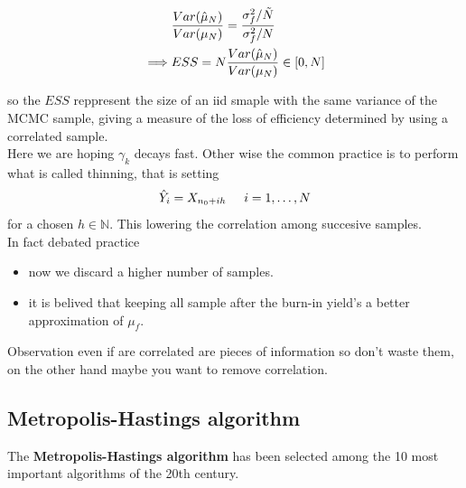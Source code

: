 \documentclass{article}
\begin{document}
\begin{align*}
       &\frac{Var(\hat{\mu}_N)}{Var(\mu_N)} = \frac{\sigma_f^2/\Tilde{N}}{\sigma_f^2/N} \\
    \implies &ESS= N \frac{Var(\hat{\mu}_N)}{Var(\mu_N)}  \in [0,N] 
\end{align*}

so the $ESS$ reppresent the size of an iid smaple with the same variance of the MCMC sample, giving a measure of the loss of efficiency determined by using a correlated sample. \\
Here we are hoping $\gamma_k$ decays fast. Other wise the common practice is to perform what is called thinning, that is setting 
\begin{equation*}
    \hat{Y}_i = X_{n_0+ih } \hspace{0.5 cm} i = 1, \dots, N
\end{equation*}
for a chosen $h \in \mathbb{N}$. This lowering the correlation among succesive samples. \\
In fact debated practice 
\begin{itemize}
    \item now we discard a higher number of samples.
    \item it is belived that keeping all sample after the burn-in yield's a better approximation of $\mu_f$.
\end{itemize}
Observation even if are correlated are pieces of information so don't waste them, on the other hand maybe you want to remove correlation. 
\subsection{Metropolis-Hastings algorithm}
The \textbf{Metropolis-Hastings algorithm} has been selected among the 10 most important algorithms of the 20th century. 
\end{document}
